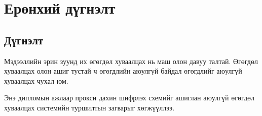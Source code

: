 \chapter{Ерөнхий дүгнэлт}

\pagecolor{white}

\section*{\centering \huge{Дүгнэлт}}
Мэдээллийн эрин зуунд их өгөгдөл хуваалцах нь маш олон давуу талтай. Өгөгдөл хуваалцах олон ашиг тустай ч өгөгдлийн аюулгүй байдал өгөгдлийг аюулгүй хуваалцах чухал юм. 

Энэ дипломын ажлаар прокси дахин шифрлэх схемийг ашиглан аюулгүй өгөгдөл хуваалцах системийн туршилтын загварыг хөгжүүллээ.

